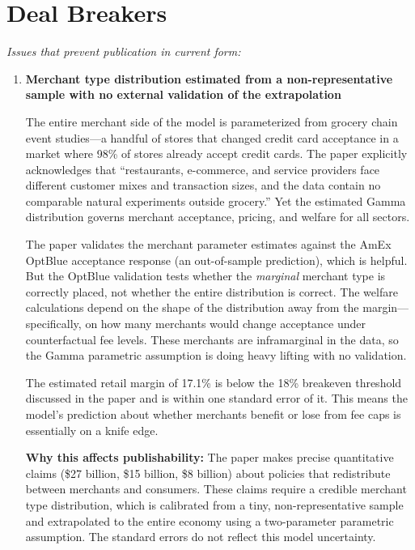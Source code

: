 \documentclass[11pt]{article}
\begin{document}
\section{Deal Breakers}

\textit{Issues that prevent publication in current form:}

\begin{enumerate}[leftmargin=*]
    \item \textbf{Merchant type distribution estimated from a non-representative sample with no external validation of the extrapolation}

    The entire merchant side of the model is parameterized from grocery chain event studies---a handful of stores that changed credit card acceptance in a market where 98\% of stores already accept credit cards. The paper explicitly acknowledges that ``restaurants, e-commerce, and service providers face different customer mixes and transaction sizes, and the data contain no comparable natural experiments outside grocery.'' Yet the estimated Gamma distribution governs merchant acceptance, pricing, and welfare for all sectors.

    The paper validates the merchant parameter estimates against the AmEx OptBlue acceptance response (an out-of-sample prediction), which is helpful. But the OptBlue validation tests whether the \emph{marginal} merchant type is correctly placed, not whether the entire distribution is correct. The welfare calculations depend on the shape of the distribution away from the margin---specifically, on how many merchants would change acceptance under counterfactual fee levels. These merchants are inframarginal in the data, so the Gamma parametric assumption is doing heavy lifting with no validation.

    The estimated retail margin of 17.1\% is below the 18\% breakeven threshold discussed in the paper and is within one standard error of it. This means the model's prediction about whether merchants benefit or lose from fee caps is essentially on a knife edge.

    \textbf{Why this affects publishability:} The paper makes precise quantitative claims (\$27 billion, \$15 billion, \$8 billion) about policies that redistribute between merchants and consumers. These claims require a credible merchant type distribution, which is calibrated from a tiny, non-representative sample and extrapolated to the entire economy using a two-parameter parametric assumption. The standard errors do not reflect this model uncertainty.


\end{enumerate}
\end{document}
